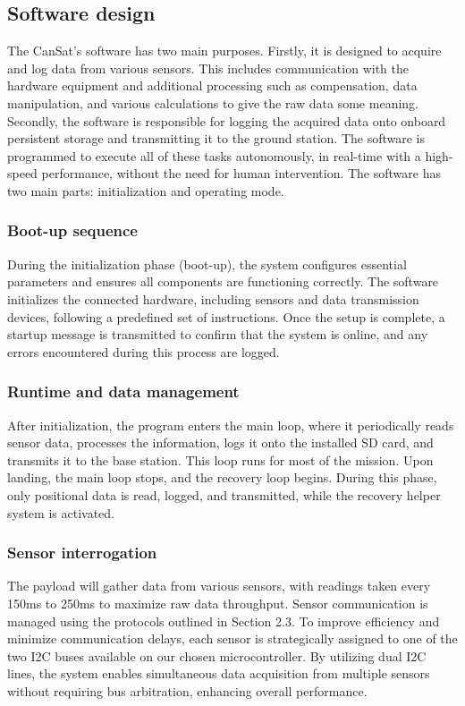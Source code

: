 
\subsection{Software design}

The CanSat’s software has two main purposes. Firstly, it is designed to acquire and log data from various sensors. This includes communication with the hardware equipment and additional processing such as compensation, data manipulation, and various calculations to give the raw data some meaning. Secondly, the software is responsible for logging the acquired data onto onboard persistent storage and transmitting it to the ground station. The software is programmed to execute all of these tasks autonomously, in real-time with a high-speed performance, without the need for human intervention. The software has two main parts: initialization and operating mode. 

\subsubsection{Boot-up sequence}
During the initialization phase (boot-up), the system configures essential parameters and ensures all components are functioning correctly. The software initializes the connected hardware, including sensors and data transmission devices, following a predefined set of instructions. Once the setup is complete, a startup message is transmitted to confirm that the system is online, and any errors encountered during this process are logged.

\subsubsection{Runtime and data management}
After initialization, the program enters the main loop, where it periodically reads sensor data, processes the information, logs it onto the installed SD card, and transmits it to the base station. This loop runs for most of the mission. Upon landing, the main loop stops, and the recovery loop begins. During this phase, only positional data is read, logged, and transmitted, while the recovery helper system is activated.

\subsubsection{Sensor interrogation}
The payload will gather data from various sensors, with readings taken every 150ms to 250ms to maximize raw data throughput. Sensor communication is managed using the protocols outlined in Section 2.3. To improve efficiency and minimize communication delays, each sensor is strategically assigned to one of the two I2C buses available on our chosen microcontroller. By utilizing dual I2C lines, the system enables simultaneous data acquisition from multiple sensors without requiring bus arbitration, enhancing overall performance.

